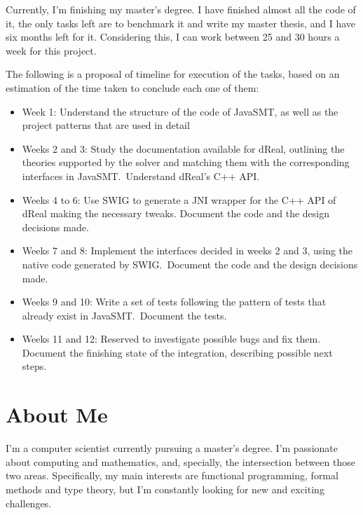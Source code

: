 \documentclass[a4paper,12pt]{article}
\begin{document}
Currently, I'm finishing my master's degree. I have finished almost all the code of it, the only tasks left are to benchmark it and write my master thesis, and I have six months left for it. Considering this, I can work between 25 and 30 hours a week for this project.

The following is a proposal of timeline for execution of the tasks, based on an estimation of the time taken to conclude each one of them:

\begin{itemize}
  \item Week 1: Understand the structure of the code of JavaSMT, as well as the project patterns that are used in detail
  \item Weeks 2 and 3: Study the documentation available for dReal, outlining the theories supported by the solver and matching them with the corresponding interfaces in JavaSMT.\ Understand dReal's C++ API.\
  \item Weeks 4 to 6: Use SWIG to generate a JNI wrapper for the C++ API of dReal making the necessary tweaks. Document the code and the design decisions made.
  \item Weeks 7 and 8: Implement the interfaces decided in weeks 2 and 3, using the native code generated by SWIG.\ Document the code and the design decisions made.
  \item Weeks 9 and 10: Write a set of tests following the pattern of tests that already exist in JavaSMT.\ Document the tests.
  \item Weeks 11 and 12: Reserved to investigate possible bugs and fix them. Document the finishing state of the integration, describing possible next steps.
\end{itemize}

\section{About Me}

I'm a computer scientist currently pursuing a master's degree. I'm passionate about computing and mathematics, and, specially, the intersection between those two areas. Specifically, my main interests are functional programming, formal methods and type theory, but I'm constantly looking for new and exciting challenges.
\end{document}
